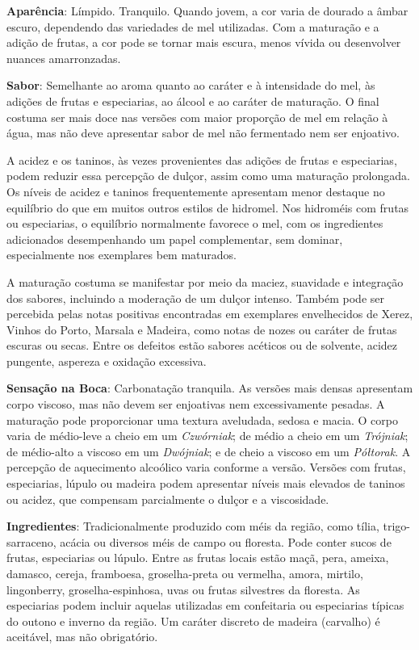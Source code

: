 \textbf{Aparência}: Límpido. Tranquilo. Quando jovem, a cor varia de dourado a âmbar escuro, dependendo das variedades de mel utilizadas. Com a maturação e a adição de frutas, a cor pode se tornar mais escura, menos vívida ou desenvolver nuances amarronzadas.

\textbf{Sabor}: Semelhante ao aroma quanto ao caráter e à intensidade do mel, às adições de frutas e especiarias, ao álcool e ao caráter de maturação. O final costuma ser mais doce nas versões com maior proporção de mel em relação à água, mas não deve apresentar sabor de mel não fermentado nem ser enjoativo.

A acidez e os taninos, às vezes provenientes das adições de frutas e especiarias, podem reduzir essa percepção de dulçor, assim como uma maturação prolongada. Os níveis de acidez e taninos frequentemente apresentam menor destaque no equilíbrio do que em muitos outros estilos de hidromel. Nos hidroméis com frutas ou especiarias, o equilíbrio normalmente favorece o mel, com os ingredientes adicionados desempenhando um papel complementar, sem dominar, especialmente nos exemplares bem maturados.

A maturação costuma se manifestar por meio da maciez, suavidade e integração dos sabores, incluindo a moderação de um dulçor intenso. Também pode ser percebida pelas notas positivas encontradas em exemplares envelhecidos de Xerez, Vinhos do Porto, Marsala e Madeira, como notas de nozes ou caráter de frutas escuras ou secas. Entre os defeitos estão sabores acéticos ou de solvente, acidez pungente, aspereza e oxidação excessiva.

\textbf{Sensação na Boca}: Carbonatação tranquila. As versões mais densas apresentam corpo viscoso, mas não devem ser enjoativas nem excessivamente pesadas. A maturação pode proporcionar uma textura aveludada, sedosa e macia. O corpo varia de médio-leve a cheio em um \textit{Czwórniak}; de médio a cheio em um \textit{Trójniak}; de médio-alto a viscoso em um \textit{Dwójniak}; e de cheio a viscoso em um \textit{Półtorak}. A percepção de aquecimento alcoólico varia conforme a versão. Versões com frutas, especiarias, lúpulo ou madeira podem apresentar níveis mais elevados de taninos ou acidez, que compensam parcialmente o dulçor e a viscosidade.

\textbf{Ingredientes}: Tradicionalmente produzido com méis da região, como tília, trigo-sarraceno, acácia ou diversos méis de campo ou floresta. Pode conter sucos de frutas, especiarias ou lúpulo. Entre as frutas locais estão maçã, pera, ameixa, damasco, cereja, framboesa, groselha-preta ou vermelha, amora, mirtilo, lingonberry, groselha-espinhosa, uvas ou frutas silvestres da floresta. As especiarias podem incluir aquelas utilizadas em confeitaria ou especiarias típicas do outono e inverno da região. Um caráter discreto de madeira (carvalho) é aceitável, mas não obrigatório.

